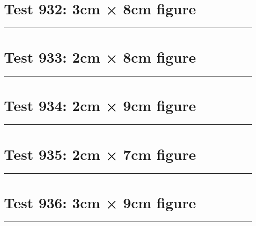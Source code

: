 \documentclass[a4paper,11pt]{article}
\begin{document}
\section*{Test 932: 3cm × 8cm figure}
\begin{swarmwrap}%
  \begin{minipage}[t]{3cm}
    \centering
    \rule{\linewidth}{8cm}
  \end{minipage}%
\end{swarmwrap}%
\swarmwrapnext
\lipsum[104]
\lipsum[105]
\lipsum[106]
\lipsum[107]
\section*{Test 933: 2cm × 8cm figure}
\begin{swarmwrap}%
  \begin{minipage}[t]{2cm}
    \centering
    \rule{\linewidth}{8cm}
  \end{minipage}%
\end{swarmwrap}%
\swarmwrapnext
\lipsum[62]
\lipsum[63]
\lipsum[64]
\lipsum[65]
\lipsum[66]
\section*{Test 934: 2cm × 9cm figure}
\begin{swarmwrap}%
  \begin{minipage}[t]{2cm}
    \centering
    \rule{\linewidth}{9cm}
  \end{minipage}%
\end{swarmwrap}%
\swarmwrapnext
\lipsum[97]
\lipsum[98]
\lipsum[99]
\lipsum[100]
\lipsum[101]
\section*{Test 935: 2cm × 7cm figure}
\begin{swarmwrap}%
  \begin{minipage}[t]{2cm}
    \centering
    \rule{\linewidth}{7cm}
  \end{minipage}%
\end{swarmwrap}%
\swarmwrapnext
\lipsum[81]
\lipsum[82]
\lipsum[83]
\lipsum[84]
\lipsum[85]
\section*{Test 936: 3cm × 9cm figure}
\begin{swarmwrap}%
  \begin{minipage}[t]{3cm}
    \centering
    \rule{\linewidth}{9cm}
  \end{minipage}%
\end{swarmwrap}%
\swarmwrapnext
\lipsum[60]
\lipsum[61]
\lipsum[62]
\end{document}
